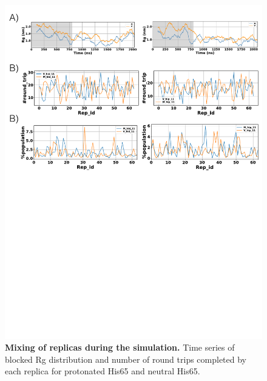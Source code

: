 \documentclass[10pt,letterpaper]{article}
\begin{document}
\begin{figure}[!ht]
 \includegraphics[scale=0.5,width=\textwidth,trim={0 0cm 0 0},clip]{../figures/S1_Fig.pdf}
\caption{{\bf Mixing of replicas during the simulation.}
Time series of blocked Rg distribution and number of round trips completed by each replica for protonated His65 and neutral His65.
 }
\label{S1_Fig} 
\end{figure}
\end{document}
